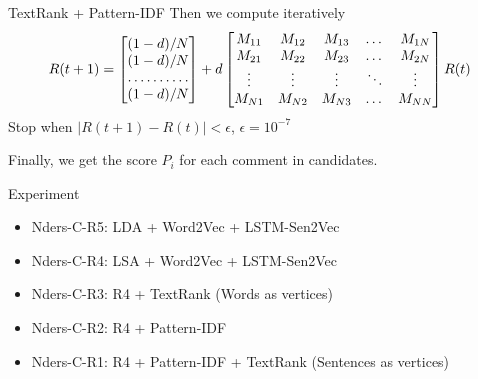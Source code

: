 \documentclass[aspectratio=169]{beamer} %
\begin{document}
    \begin{frame}{TextRank + Pattern-IDF}
      Then we compute iteratively
      \[
      R(t+1) = 
      \begin{bmatrix}
          (1-d)/N       \\
          (1-d)/N       \\
          \hdotsfor{1} \\
          (1-d)/N       
      \end{bmatrix}
      +d
      \begin{bmatrix}
          M_{11} & M_{12} & M_{13} & \dots  & M_{1N} \\
          M_{21} & M_{22} & M_{23} & \dots  & M_{2N} \\
          \vdots & \vdots & \vdots & \ddots & \vdots \\
          M_{N1} & M_{N2} & M_{N3} & \dots  & M_{NN}
      \end{bmatrix}
      R(t)
      \]
      Stop when $|R(t+1)-R(t)|<\epsilon$, $\epsilon = 10^{-7}$

      Finally, we get the score $P_i$ for each comment in candidates. 
    \end{frame}

  \begin{frame}{Experiment}
    \begin{itemize}
      \item{Nders-C-R5: } LDA + Word2Vec + LSTM-Sen2Vec 
      \item{Nders-C-R4: } LSA + Word2Vec + LSTM-Sen2Vec 
      \item{Nders-C-R3: } R4 + TextRank (Words as vertices)
      \item{Nders-C-R2: } R4 + Pattern-IDF 
      \item{Nders-C-R1: } R4 + Pattern-IDF + TextRank (Sentences as vertices)
    \end{itemize}
  \end{frame}
\end{document}
